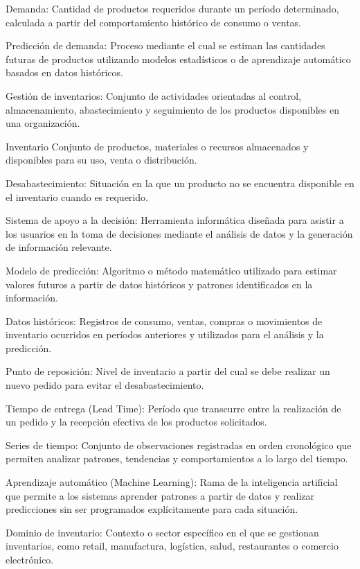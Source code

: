 Demanda:
Cantidad de productos requeridos durante un período determinado, calculada a partir del comportamiento histórico de consumo o ventas.

Predicción de demanda:
Proceso mediante el cual se estiman las cantidades futuras de productos utilizando modelos estadísticos o de aprendizaje automático basados en datos históricos.

Gestión de inventarios:
Conjunto de actividades orientadas al control, almacenamiento, abastecimiento y seguimiento de los productos disponibles en una organización.

Inventario
Conjunto de productos, materiales o recursos almacenados y disponibles para su uso, venta o distribución.

Desabastecimiento:
Situación en la que un producto no se encuentra disponible en el inventario cuando es requerido.

Sistema de apoyo a la decisión:
Herramienta informática diseñada para asistir a los usuarios en la toma de decisiones mediante el análisis de datos y la generación de información relevante.

Modelo de predicción:
Algoritmo o método matemático utilizado para estimar valores futuros a partir de datos históricos y patrones identificados en la información.

Datos históricos:
Registros de consumo, ventas, compras o movimientos de inventario ocurridos en períodos anteriores y utilizados para el análisis y la predicción.

Punto de reposición:
Nivel de inventario a partir del cual se debe realizar un nuevo pedido para evitar el desabastecimiento.

Tiempo de entrega (Lead Time):
Período que transcurre entre la realización de un pedido y la recepción efectiva de los productos solicitados.

Series de tiempo:
Conjunto de observaciones registradas en orden cronológico que permiten analizar patrones, tendencias y comportamientos a lo largo del tiempo.

Aprendizaje automático (Machine Learning):
Rama de la inteligencia artificial que permite a los sistemas aprender patrones a partir de datos y realizar predicciones sin ser programados explícitamente para cada situación.

Dominio de inventario:
Contexto o sector específico en el que se gestionan inventarios, como retail, manufactura, logística, salud, restaurantes o comercio electrónico.
